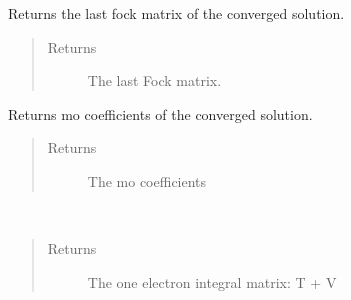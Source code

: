 \documentclass[letterpaper,10pt,english]{sphinxmanual}
\begin{document}
\begin{fulllineitems}
\begin{fulllineitems}
\label{\detokenize{RHF:ghf.RHF.RHF.get_last_fock}}
Returns the last fock matrix of the converged solution.
\begin{quote}\begin{description}
\item[{Returns}] \leavevmode
The last Fock matrix.

\end{description}\end{quote}

\end{fulllineitems}


\begin{fulllineitems}
\label{\detokenize{RHF:ghf.RHF.RHF.get_mo_coeff}}
Returns mo coefficients of the converged solution.
\begin{quote}\begin{description}
\item[{Returns}] \leavevmode
The mo coefficients

\end{description}\end{quote}

\end{fulllineitems}


\begin{fulllineitems}
\label{\detokenize{RHF:ghf.RHF.RHF.get_one_e}}~\begin{quote}\begin{description}
\item[{Returns}] \leavevmode
The one electron integral matrix: T + V

\end{description}\end{quote}

\end{fulllineitems}



\end{fulllineitems}
\end{document}
